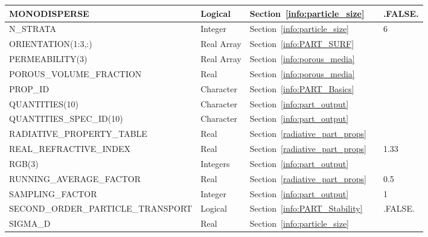 \documentclass[11pt]{book}
\begin{document}
\begin{longtable}{@{\extracolsep{\fill}}|l|l|l|l|l|}
{\ct MONODISPERSE}                       & Logical         & Section~\ref{info:particle_size}        &           & {\ct .FALSE.} \\ \hline
{\ct N\_STRATA}                          & Integer         & Section~\ref{info:particle_size}        &           & 6             \\ \hline
{\ct ORIENTATION(1:3,:)}                 & Real Array      & Section~\ref{info:PART_SURF}            &           &               \\ \hline
{\ct PERMEABILITY(3)}                    & Real Array      & Section~\ref{info:porous_media}         &           &               \\ \hline
{\ct POROUS\_VOLUME\_FRACTION}           & Real            & Section~\ref{info:porous_media}         &           &               \\ \hline
{\ct PROP\_ID}                           & Character       & Section~\ref{info:PART_Basics}          &           &               \\ \hline
{\ct QUANTITIES(10)}                     & Character       & Section~\ref{info:part_output}          &           &               \\ \hline
{\ct QUANTITIES\_SPEC\_ID(10)}           & Character       & Section~\ref{info:part_output}          &           &               \\ \hline
{\ct RADIATIVE\_PROPERTY\_TABLE}         & Real            & Section~\ref{radiative_part_props}      &           &               \\ \hline
{\ct REAL\_REFRACTIVE\_INDEX}            & Real            & Section~\ref{radiative_part_props}      &           & 1.33          \\ \hline
{\ct RGB(3)}                             & Integers        & Section~\ref{info:part_output}          &           &               \\ \hline
{\ct RUNNING\_AVERAGE\_FACTOR}           & Real            & Section~\ref{radiative_part_props}      &           & 0.5           \\ \hline
{\ct SAMPLING\_FACTOR}                   & Integer         & Section~\ref{info:part_output}          &           & 1             \\ \hline
{\ct SECOND\_ORDER\_PARTICLE\_TRANSPORT} & Logical         & Section~\ref{info:PART_Stability}       &           & {\ct .FALSE.} \\ \hline
{\ct SIGMA\_D}                           & Real            & Section~\ref{info:particle_size}        &           &               \\ \hline

\end{longtable}
\end{document}
